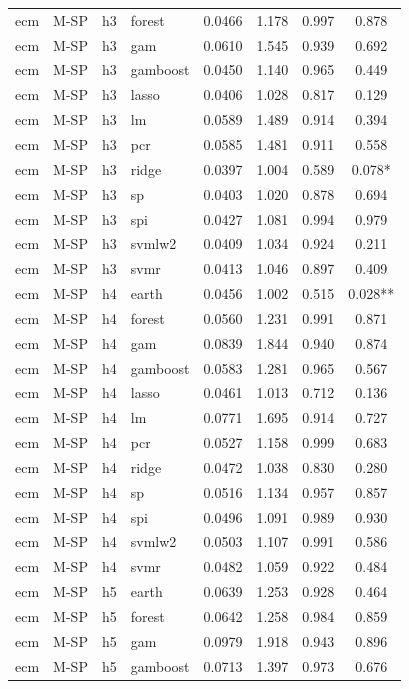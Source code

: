 \begin{ThreePartTable}
\begin{longtable}[t]{llclcccc}
ecm & M-SP & h3 & forest & 0.0466 & 1.178 & 0.997 & 0.878\\
ecm & M-SP & h3 & gam & 0.0610 & 1.545 & 0.939 & 0.692\\
ecm & M-SP & h3 & gamboost & 0.0450 & 1.140 & 0.965 & 0.449\\
ecm & M-SP & h3 & lasso & 0.0406 & 1.028 & 0.817 & 0.129\\
ecm & M-SP & h3 & lm & 0.0589 & 1.489 & 0.914 & 0.394\\
ecm & M-SP & h3 & pcr & 0.0585 & 1.481 & 0.911 & 0.558\\
ecm & M-SP & h3 & ridge & 0.0397 & 1.004 & 0.589 & 0.078*\\
ecm & M-SP & h3 & sp & 0.0403 & 1.020 & 0.878 & 0.694\\
ecm & M-SP & h3 & spi & 0.0427 & 1.081 & 0.994 & 0.979\\
ecm & M-SP & h3 & svmlw2 & 0.0409 & 1.034 & 0.924 & 0.211\\
ecm & M-SP & h3 & svmr & 0.0413 & 1.046 & 0.897 & 0.409\\
\addlinespace
ecm & M-SP & h4 & earth & 0.0456 & 1.002 & 0.515 & 0.028**\\
ecm & M-SP & h4 & forest & 0.0560 & 1.231 & 0.991 & 0.871\\
ecm & M-SP & h4 & gam & 0.0839 & 1.844 & 0.940 & 0.874\\
ecm & M-SP & h4 & gamboost & 0.0583 & 1.281 & 0.965 & 0.567\\
ecm & M-SP & h4 & lasso & 0.0461 & 1.013 & 0.712 & 0.136\\
ecm & M-SP & h4 & lm & 0.0771 & 1.695 & 0.914 & 0.727\\
ecm & M-SP & h4 & pcr & 0.0527 & 1.158 & 0.999 & 0.683\\
ecm & M-SP & h4 & ridge & 0.0472 & 1.038 & 0.830 & 0.280\\
ecm & M-SP & h4 & sp & 0.0516 & 1.134 & 0.957 & 0.857\\
ecm & M-SP & h4 & spi & 0.0496 & 1.091 & 0.989 & 0.930\\
ecm & M-SP & h4 & svmlw2 & 0.0503 & 1.107 & 0.991 & 0.586\\
ecm & M-SP & h4 & svmr & 0.0482 & 1.059 & 0.922 & 0.484\\
\addlinespace
ecm & M-SP & h5 & earth & 0.0639 & 1.253 & 0.928 & 0.464\\
ecm & M-SP & h5 & forest & 0.0642 & 1.258 & 0.984 & 0.859\\
ecm & M-SP & h5 & gam & 0.0979 & 1.918 & 0.943 & 0.896\\
ecm & M-SP & h5 & gamboost & 0.0713 & 1.397 & 0.973 & 0.676\\

\end{longtable}
\end{ThreePartTable}
